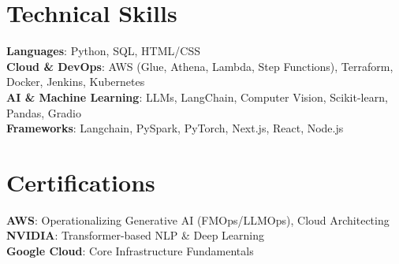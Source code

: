 \documentclass[letterpaper,11pt]{article}
\begin{document}
\section{Technical Skills}
 \begin{itemize}[leftmargin=0.15in, label={}]
    \small{\item{
     \textbf{Languages}{: Python, SQL, HTML/CSS} \\
     \textbf{Cloud \& DevOps}{: AWS (Glue, Athena, Lambda, Step Functions), Terraform, Docker, Jenkins, Kubernetes} \\
     \textbf{AI \& Machine Learning}{: LLMs, LangChain, Computer Vision, Scikit-learn, Pandas, Gradio} \\
     \textbf{Frameworks}{: Langchain, PySpark, PyTorch, Next.js, React, Node.js}
    }}
 \end{itemize}

\section{Certifications}
 \begin{itemize}[leftmargin=0.15in, label={}]
    \small{\item{
     \textbf{AWS}: Operationalizing Generative AI (FMOps/LLMOps), Cloud Architecting \\
     \textbf{NVIDIA}: Transformer-based NLP \& Deep Learning \\
     \textbf{Google Cloud}: Core Infrastructure Fundamentals
    }}
 \end{itemize}
\end{document}
